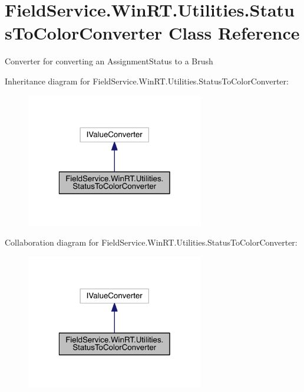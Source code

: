 \hypertarget{class_field_service_1_1_win_r_t_1_1_utilities_1_1_status_to_color_converter}{\section{Field\+Service.\+Win\+R\+T.\+Utilities.\+Status\+To\+Color\+Converter Class Reference}
\label{class_field_service_1_1_win_r_t_1_1_utilities_1_1_status_to_color_converter}
}


Converter for converting an Assignment\+Status to a Brush  




Inheritance diagram for Field\+Service.\+Win\+R\+T.\+Utilities.\+Status\+To\+Color\+Converter\+:
\nopagebreak
\begin{figure}[H]
\begin{center}
\leavevmode
\includegraphics[width=220pt]{class_field_service_1_1_win_r_t_1_1_utilities_1_1_status_to_color_converter__inherit__graph}
\end{center}
\end{figure}


Collaboration diagram for Field\+Service.\+Win\+R\+T.\+Utilities.\+Status\+To\+Color\+Converter\+:
\nopagebreak
\begin{figure}[H]
\begin{center}
\leavevmode
\includegraphics[width=220pt]{class_field_service_1_1_win_r_t_1_1_utilities_1_1_status_to_color_converter__coll__graph}
\end{center}
\end{figure}
